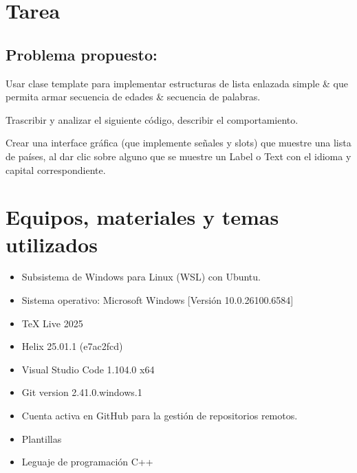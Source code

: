 \section{Tarea}

\subsection{Problema propuesto: }

\begin{enumerate}[label={[\arabic*]}]
    \item Usar clase template para implementar estructuras de lista enlazada simple & que permita armar secuencia de edades & secuencia de palabras. 
    \item Trascribir y analizar el siguiente código, describir el comportamiento.
    \item Crear una interface gráfica (que implemente señales y slots) que muestre una lista de países, al dar clic sobre alguno que se muestre un Label o Text con el idioma y capital correspondiente.
\end{enumerate}




\section{Equipos, materiales y temas utilizados}

\begin{itemize}
    \item Subsistema de Windows para Linux (WSL) con Ubuntu.
    \item Sistema operativo: Microsoft Windows [Versión 10.0.26100.6584]
    \item TeX Live 2025
    \item Helix 25.01.1 (e7ac2fcd)
    \item Visual Studio Code 1.104.0 x64
    \item Git version 2.41.0.windows.1
    \item Cuenta activa en GitHub para la gestión de repositorios remotos.
    \item Plantillas
    \item Leguaje de programación C++
\end{itemize}




